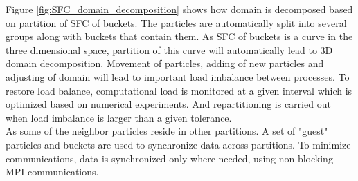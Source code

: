\documentclass[procedia]{easychair}
\begin{document}
Figure \ref{fig:SFC_domain_decomposition} shows how domain is decomposed based on partition of SFC of buckets. The particles are automatically split into several groups along with buckets that contain them. As SFC of buckets is a curve in the three dimensional space, partition of this curve will automatically lead to 3D domain decomposition. 
Movement of particles, adding of new particles and adjusting of domain will lead to important load imbalance between processes. To restore load balance, computational load is monitored at a given interval which is optimized based on numerical experiments. And repartitioning is carried out when load imbalance is larger than a given tolerance.
\\
As some of the neighbor particles reside in other partitions. A set of "guest" particles and buckets are used to synchronize data across partitions. To minimize communications, data is synchronized only where needed, using non-blocking MPI communications. 
\end{document}
